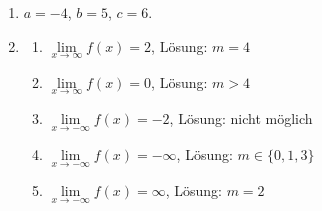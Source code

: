 \begin{enumerate}
\begin{enumerate}
    \item $\lim\limits_{x \to \infty} \frac{2x^6 - 3x^5 + 7x^3 + 4x - 8}{5x^6 + 8x^5 - 9x^4 + 11x^2} = \frac{2}{5}$, $\lim\limits_{x \to -\infty} \frac{2x^6 - 3x^5 + 7x^3 + 4x - 8}{5x^6 + 8x^5 - 9x^4 + 11x^2} = \frac{2}{5}$
    \item $\lim\limits_{x \to \infty} \frac{10x^8 - 4x^7 + 12}{x^9 + 3x^6 + 4} = 0$, $\lim\limits_{x \to -\infty} \frac{10x^8 - 4x^7 + 12}{x^9 + 3x^6 + 4} = 0$
    \item   $\lim\limits_{x \to \infty} \frac{10x^8 - 4x^7 + 12}{x^7 + 3x^6 + 4} = \infty$, \quad $\lim\limits_{x \to -\infty} \frac{10x^8 - 4x^7 + 12}{x^7+ 3x^6 + 4}=- \infty$
    \item   $\lim\limits_{x \to \infty} \frac{10x^8 - 4x^7 + 12}{ 3x^6 + 4}= \infty$, \quad $\lim\limits_{x \to -\infty} \frac{10x^8 - 4x^7 + 12}{3x^6 + 4}= \infty$
    \item $\lim\limits_{x \to \infty} \frac{\sqrt{x + 1}}{x - 1} = 0$, $\lim\limits_{x \to -\infty} \frac{\sqrt{x + 1}}{x - 1}$ gibt es nicht 
    \item $\lim\limits_{x \to \infty} \frac{x^9 + x^4}{e^x} = 0$, $\lim\limits_{x \to -\infty} \frac{x^9 + x^4}{e^x} = -\infty$
\end{enumerate}

\item $a = -4$, $b = 5$, $c = 6$.

\item    \begin{enumerate}
        \item $\lim\limits_{x \to \infty} f(x) = 2$, Lösung: $m = 4$
        \item $\lim\limits_{x \to \infty} f(x) = 0$, Lösung:  $m>4$ 
        \item $\lim\limits_{x \to -\infty} f(x) = -2$, Lösung: nicht möglich
        \item $\lim\limits_{x \to -\infty} f(x) = -\infty$, Lösung: $m\in \{0, 1, 3\}$
        \item $\lim\limits_{x \to -\infty} f(x) = \infty$, Lösung: $m =2$
    \end{enumerate}

\end{enumerate}














